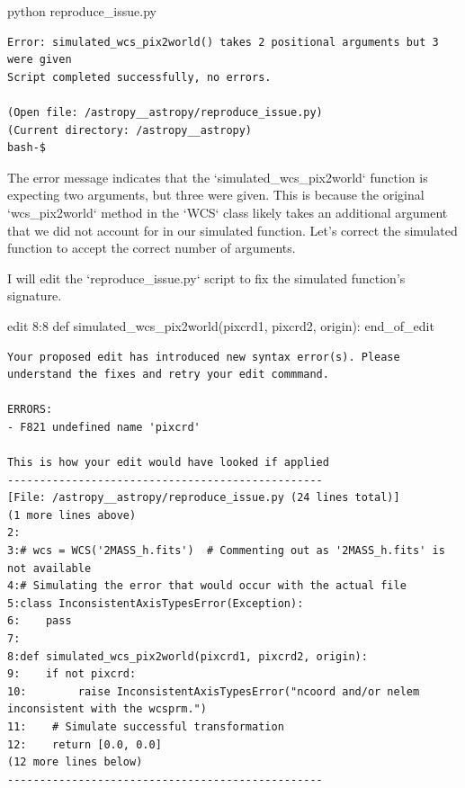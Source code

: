 {\begin{agentbox}
\hrulefill
\begin{CodeVerbatim}[breaklines=true, breakanywhere=true]
python reproduce_issue.py
\end{CodeVerbatim}
\end{agentbox}
\begin{observationbox}\begin{Verbatim}[breaklines=true, breakanywhere=true]
Error: simulated_wcs_pix2world() takes 2 positional arguments but 3 were given
Script completed successfully, no errors.

(Open file: /astropy__astropy/reproduce_issue.py)
(Current directory: /astropy__astropy)
bash-$
\end{Verbatim}
\end{observationbox}
\begin{agentbox}
The error message indicates that the `simulated\_wcs\_pix2world` function is expecting two arguments, but three were given. This is because the original `wcs\_pix2world` method in the `WCS` class likely takes an additional argument that we did not account for in our simulated function. Let's correct the simulated function to accept the correct number of arguments.



I will edit the `reproduce\_issue.py` script to fix the simulated function's signature.

\hrulefill
\begin{CodeVerbatim}[breaklines=true, breakanywhere=true]
edit 8:8
def simulated_wcs_pix2world(pixcrd1, pixcrd2, origin):
end_of_edit
\end{CodeVerbatim}
\end{agentbox}
\begin{observationbox}\begin{Verbatim}[breaklines=true, breakanywhere=true]
Your proposed edit has introduced new syntax error(s). Please understand the fixes and retry your edit commmand.

ERRORS:
- F821 undefined name 'pixcrd'

This is how your edit would have looked if applied
-------------------------------------------------
[File: /astropy__astropy/reproduce_issue.py (24 lines total)]
(1 more lines above)
2:
3:# wcs = WCS('2MASS_h.fits')  # Commenting out as '2MASS_h.fits' is not available
4:# Simulating the error that would occur with the actual file
5:class InconsistentAxisTypesError(Exception):
6:    pass
7:
8:def simulated_wcs_pix2world(pixcrd1, pixcrd2, origin):
9:    if not pixcrd:
10:        raise InconsistentAxisTypesError("ncoord and/or nelem inconsistent with the wcsprm.")
11:    # Simulate successful transformation
12:    return [0.0, 0.0]
(12 more lines below)
-------------------------------------------------


\end{Verbatim}
\end{observationbox}}
